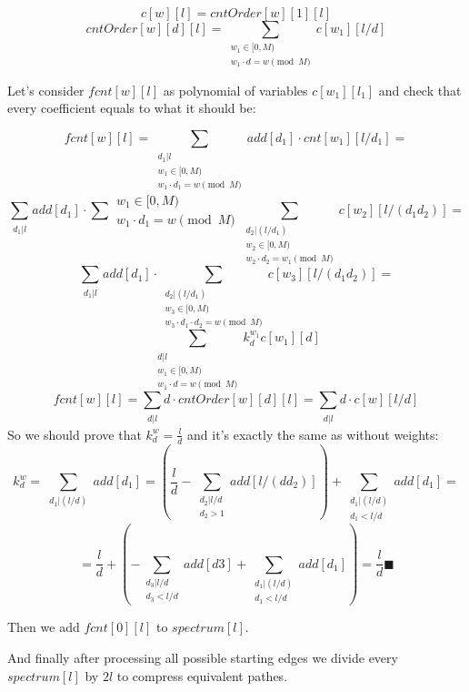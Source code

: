 \documentclass{article}
\begin{document}
\[
c[w][l] = cntOrder[w][1][l]
\]
\[
cntOrder[w][d][l] = \sum_{\substack{w_1 \in [0, M) \\ w_1 \cdot d = w \pmod{M} }} c[w_1][l / d]
\]

Let's consider $fcnt[w][l]$ as polynomial of variables $c[w_1][l_1]$ and check that every
coefficient equals to what it should be:

\[
fcnt[w][l] = \sum_{\substack{d_1 | l \\ w_1 \in [0, M) \\ w_1 \cdot d_1 = w \pmod {M}}} add[d_1] \cdot cnt[w_1][l / d_1] =
\]
\[
\sum_{\substack{d_1 | l}} add[d_1] \cdot \sum{\substack{w_1 \in [0, M) \\ w_1 \cdot d_1 = w \pmod {M}}} \sum_{\substack{d_2 | (l/d_1) \\ w_2 \in [0, M) \\ w_2 \cdot d_2 = w_1 \pmod {M}}} c[w_2][l/(d_1 d_2)] = 
\]
\[
\sum_{\substack{d_1 | l}} add[d_1] \cdot \sum_{\substack{d_2 | (l/d_1) \\ w_3 \in [0, M) \\ w_3 \cdot d_1 \cdot d_2 = w \pmod {M}}} c[w_3][l/(d_1 d_2)] = 
\]
\[
\sum_{\substack{d | l \\ w_1 \in [0, M) \\ w_1 \cdot d = w \pmod {M}}} k^{w_1}_d c[w_1][d]
\]
\[
fcnt[w][l] = \sum_{\substack{d | l}} d \cdot cntOrder[w][d][l] = \sum_{\substack{d | l}} d \cdot c[w][l/d]
\]
So we should prove that $k^w_d = \frac{l}{d}$ and it's exactly the same as without weights:
\[
k^w_d = \sum_{\substack{d_1 | (l/d)}} add[d_1]  = (\frac{l}{d} - \sum_{\substack{d_2 | l/d \\ d_2 > 1}} add[l / (d d_2)])  + \sum_{\substack{d_1 | (l/d) \\ d_1 < l/d}} add[d_1] =
\]
\[
=\frac{l}{d} + (-\sum_{\substack{d_3 | l/d \\ d_3 < l/d}} add[d3]  + \sum_{\substack{d_1 | (l/d) \\ d_1 < l/d}} add[d_1]) = \frac{l}{d}     \blacksquare
\]

Then we add $fcnt[0][l]$ to $spectrum[l]$.

And finally after processing all possible starting edges we divide every $spectrum[l]$ by $2l$
to compress equivalent pathes.
\end{document}
